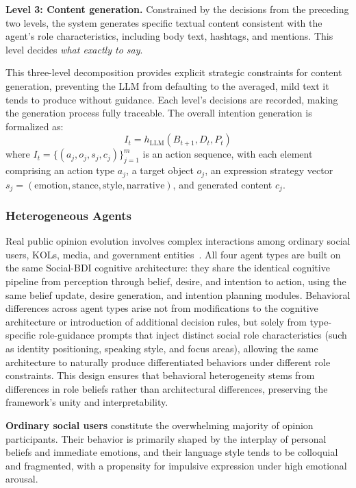 \documentclass[a4paper,fleqn]{cas-dc}
\begin{document}
\textbf{Level 3: Content generation.} Constrained by the decisions from the preceding two levels, the system generates specific textual content consistent with the agent's role characteristics, including body text, hashtags, and mentions. This level decides \textit{what exactly to say}.

This three-level decomposition provides explicit strategic constraints for content generation, preventing the LLM from defaulting to the averaged, mild text it tends to produce without guidance. Each level's decisions are recorded, making the generation process fully traceable. The overall intention generation is formalized as:
\begin{equation}
I_t = h_{\text{LLM}}(B_{t+1}, D_t, P_t)
\end{equation}
where $I_t = \{(a_j, o_j, s_j, c_j)\}_{j=1}^{m}$ is an action sequence, with each element comprising an action type $a_j$, a target object $o_j$, an expression strategy vector $s_j = (\text{emotion}, \text{stance}, \text{style}, \text{narrative})$, and generated content $c_j$.

\subsubsection{Heterogeneous Agents}

Real public opinion evolution involves complex interactions among ordinary social users, KOLs, media, and government entities~\citep{chen_evolution_2025,wu_public_2023}. All four agent types are built on the same Social-BDI cognitive architecture: they share the identical cognitive pipeline from perception through belief, desire, and intention to action, using the same belief update, desire generation, and intention planning modules. Behavioral differences across agent types arise not from modifications to the cognitive architecture or introduction of additional decision rules, but solely from type-specific role-guidance prompts that inject distinct social role characteristics (such as identity positioning, speaking style, and focus areas), allowing the same architecture to naturally produce differentiated behaviors under different role constraints. This design ensures that behavioral heterogeneity stems from differences in role beliefs rather than architectural differences, preserving the framework's unity and interpretability.

\textbf{Ordinary social users} constitute the overwhelming majority of opinion participants. Their behavior is primarily shaped by the interplay of personal beliefs and immediate emotions, and their language style tends to be colloquial and fragmented, with a propensity for impulsive expression under high emotional arousal.
\end{document}
